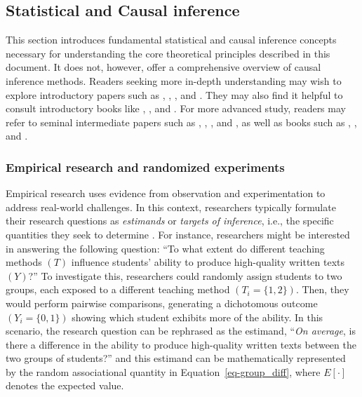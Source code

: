 \documentclass[
  authoryear,
  review,
  1p]{elsarticle}
\begin{document}
\subsection{Statistical and Causal inference}\label{sec-appendixB}

This section introduces fundamental statistical and causal inference
concepts necessary for understanding the core theoretical principles
described in this document. It does not, however, offer a comprehensive
overview of causal inference methods. Readers seeking more in-depth
understanding may wish to explore introductory papers such as
\citet{Pearl_2010}, \citet{Rohrer_2018}, \citet{Pearl_2019}, and
\citet{Cinelli_et_al_2020}. They may also find it helpful to consult
introductory books like \citet{Pearl_et_al_2018}, \citet{Neal_2020}, and
\citet{McElreath_2020}. For more advanced study, readers may refer to
seminal intermediate papers such as \citet{Neyman_et_al_1923},
\citet{Rubin_1974}, \citet{Spirtes_et_al_1991}, and \citet{Sekhon_2009},
as well as books such as \citet{Pearl_2009}, \citet{Morgan_et_al_2014},
and \citet{Hernan_et_al_2025}.

\subsubsection{Empirical research and randomized
experiments}\label{sec-appendixB1}

Empirical research uses evidence from observation and experimentation to
address real-world challenges. In this context, researchers typically
formulate their research questions as \emph{estimands} or \emph{targets
of inference}, i.e., the specific quantities they seek to determine
\citep{Everitt_et_al_2010}. For instance, researchers might be
interested in answering the following question: ``To what extent do
different teaching methods \((T)\) influence students' ability to
produce high-quality written texts \((Y)\)?'' To investigate this,
researchers could randomly assign students to two groups, each exposed
to a different teaching method \((T_{i} = \{1,2\})\). Then, they would
perform pairwise comparisons, generating a dichotomous outcome
\((Y_{i} = \{0,1\})\) showing which student exhibits more of the
ability. In this scenario, the research question can be rephrased as the
estimand, ``\emph{On average}, is there a difference in the ability to
produce high-quality written texts between the two groups of students?''
and this estimand can be mathematically represented by the random
associational quantity in Equation~\ref{eq-group_diff}, where
\(E[\cdot]\) denotes the expected value.
\end{document}
